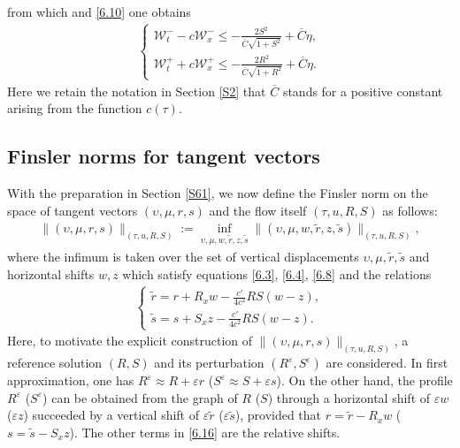 \documentclass[11pt,reqno]{article}
\newcommand{\eps}{\varepsilon}
\newcommand{\dps}{\displaystyle}
\newcommand{\fr}{\frac}
\numberwithin{equation}{section}
\begin{document}
from which and \eqref{6.10} one obtains
\begin{align}\label{6.13}
\left\{
\begin{array}{l}
\dps \mathcal{W}_t^--c\mathcal{W}_{x}^-\leq -\fr{2S^2}{\overline{C}\sqrt{1+S^2}} +\overline{C}\eta, \\[12pt]
\dps \mathcal{W}_t^++c\mathcal{W}_{x}^+\leq -\fr{2R^2}{\overline{C}\sqrt{1+R^2}} +\overline{C}\eta.
\end{array}
\right.
\end{align}
Here we retain the notation in Section \ref{S2} that $\overline{C}$ stands for a positive constant arising from the function $c(\tau)$.



\subsection{Finsler norms for tangent vectors}\label{S62}


With the preparation in Section \ref{S61}, we now define the Finsler norm on the space of tangent
vectors $(\upsilon, \mu, r, s)$ and the flow itself $(\tau, u, R, S)$ as follows:
\begin{align}\label{6.15}
\|(\upsilon, \mu, r, s)\|_{(\tau, u, R, S)}:=\inf_{\upsilon, \mu, w, \tilde{r}, z, \tilde{s}}\|(\upsilon, \mu, w, \tilde{r}, z, \tilde{s})\|_{(\tau, u, R, S)},
\end{align}
where the infimum is taken over the set of vertical displacements $\upsilon, \mu, \tilde{r}, \tilde{s}$ and horizontal shifts
$w, z$ which satisfy equations \eqref{6.3}, \eqref{6.4}, \eqref{6.8} and the relations
\begin{align}\label{6.16}
\left\{
\begin{array}{l}
\dps \tilde{r}=r+R_x w-\fr{c'}{4c^2}RS(w-z),\\[12pt]
\dps \tilde{s}=s+S_x z-\fr{c'}{4c^2}RS(w-z).
\end{array}
\right.
\end{align}
Here, to motivate the explicit construction of $\|(\upsilon, \mu, r, s)\|_{(\tau, u, R, S)}$, a reference solution $(R,S)$ and its perturbation $(R^\eps, S^\eps)$ are considered. In first approximation, one has $R^\eps\approx R+\eps r$ ($S^\eps\approx S+\eps s$). On the other hand, the profile $R^\eps$ ($S^\eps$) can be obtained from the graph of $R$ ($S$) through a horizontal shift of $\eps w$ ($\eps z$) succeeded by a vertical shift of $\eps \tilde{r}$ ($\eps \tilde{s}$), provided that
$r=\tilde{r}-R_xw$ ($s=\tilde{s}-S_xz$). The other terms in \eqref{6.16} are the relative shifts.
\end{document}
